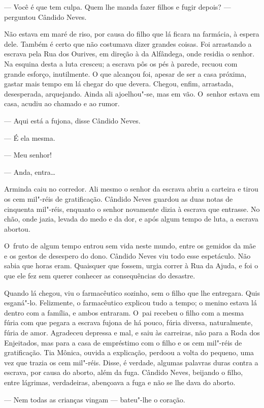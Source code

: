 \begin{linenumbers}
--- Você é que tem culpa. Quem lhe manda fazer filhos e fugir depois? ---
perguntou Cândido Neves.

Não estava em maré de riso, por causa do filho que lá ficara na
farmácia, à espera dele. Também é certo que não costumava dizer grandes
coisas. Foi arrastando a escrava pela Rua dos Ourives, em direção à da
Alfândega, onde residia o senhor. Na esquina desta a luta cresceu; a
escrava pôs os pés à parede, recuou com grande esforço, inutilmente. O
que alcançou foi, apesar de ser a casa próxima, gastar mais tempo em lá
chegar do que devera. Chegou, enfim, arrastada, desesperada, arquejando.
Ainda ali ajoelhou"-se, mas em vão. O~senhor estava em casa, acudiu ao
chamado e ao rumor.

--- Aqui está a fujona, disse Cândido Neves.

--- É ela mesma.

--- Meu senhor!

--- Anda, entra\ldots{}

Arminda caiu no corredor. Ali mesmo o senhor da escrava abriu a carteira
e tirou os cem mil"-réis de gratificação. Cândido Neves guardou as duas
notas de cinquenta mil"-réis, enquanto o senhor novamente dizia à escrava
que entrasse. No chão, onde jazia, levada do medo e da dor, e após algum
tempo de luta, a escrava abortou.

O~fruto de algum tempo entrou sem vida neste mundo, entre os gemidos da
mãe e os gestos de desespero do dono. Cândido Neves viu todo esse
espetáculo. Não sabia que horas eram. Quaisquer que fossem, urgia correr
à Rua da Ajuda, e foi o que ele fez sem querer conhecer as consequências
do desastre.

Quando lá chegou, viu o farmacêutico sozinho, sem o filho que lhe
entregara. Quis esganá"-lo. Felizmente, o farmacêutico explicou tudo a
tempo; o menino estava lá dentro com a família, e ambos entraram. O~pai
recebeu o filho com a mesma fúria com que pegara a escrava fujona de há
pouco, fúria diversa, naturalmente, fúria de amor. Agradeceu depressa e
mal, e saiu às carreiras, não para a Roda dos Enjeitados, mas para a
casa de empréstimo com o filho e os cem mil"-réis de gratificação. Tia
Mônica, ouvida a explicação, perdoou a volta do pequeno, uma vez que
trazia os cem mil"-réis. Disse, é verdade, algumas palavras duras contra
a escrava, por causa do aborto, além da fuga. Cândido Neves, beijando o
filho, entre lágrimas, verdadeiras, abençoava a fuga e não se lhe dava
do aborto.

--- Nem todas as crianças vingam ­--- bateu"-lhe o coração.

\end{linenumbers}

